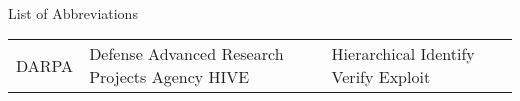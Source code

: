 

\renewcommand{\baselinestretch}{1}
\small\normalsize
\hbox{\ }

\vspace{.5in}

\begin{center}
\large{List of Abbreviations}
\end{center} 

\vspace{3pt}

\begin{supertabular}{ll}
DARPA & Defense Advanced Research Projects Agency
HIVE & Hierarchical Identify Verify Exploit \\

\end{supertabular}
